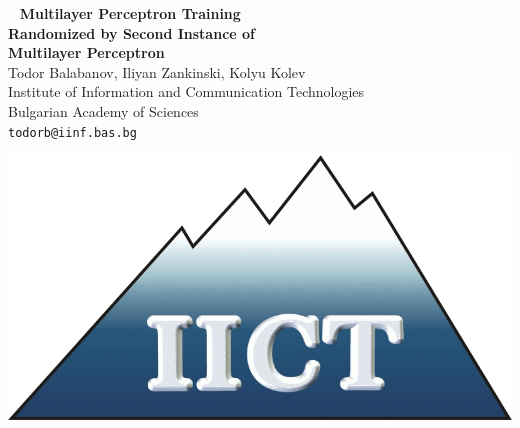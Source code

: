 \documentclass[a0,portrait,25pt]{sciposter}
\begin{document}
\pagecolor{LightGray}

\begin{mdframed}[backgroundcolor=white,roundcorner=4pt,shadow=true,linewidth=1pt]
\begin{minipage}[b]{1.44  \linewidth}
\begin{multicols}{2}
\
\color{DimGray}
\Huge \textbf{Multilayer Perceptron Training \\ Randomized by Second Instance of \\ Multilayer Perceptron} \\
\huge {Todor Balabanov, Iliyan Zankinski, Kolyu Kolev} \\ [0.5cm] 
\huge Institute of Information and Communication Technologies \\  Bulgarian Academy of Sciences \\ [0.4cm]
\Large \texttt{todorb@iinf.bas.bg}

\includegraphics[width=20cm]{logo-iict-en}
\end{multicols}
\end{minipage}
\end{mdframed}

\vspace{0.5cm}
\end{document}
